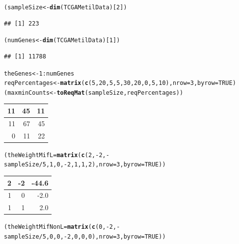 \documentclass[a4paper,10pt]{article}\usepackage[]{graphicx}\usepackage[]{xcolor}
\makeatletter
\newcommand{\hlnum}[1]{\textcolor[rgb]{0.686,0.059,0.569}{#1}}%
\newcommand{\hlopt}[1]{\textcolor[rgb]{0,0,0}{#1}}%
\newcommand{\hlstd}[1]{\textcolor[rgb]{0.345,0.345,0.345}{#1}}%
\newcommand{\hlkwb}[1]{\textcolor[rgb]{0.69,0.353,0.396}{#1}}%
\newcommand{\hlkwc}[1]{\textcolor[rgb]{0.333,0.667,0.333}{#1}}%
\newcommand{\hlkwd}[1]{\textcolor[rgb]{0.737,0.353,0.396}{\textbf{#1}}}%
\newenvironment{kframe}{%
 \def\at@end@of@kframe{}%
 \ifinner\ifhmode%
  \def\at@end@of@kframe{\end{minipage}}%
  \begin{minipage}{\columnwidth}%
 \fi\fi%
 \def\FrameCommand##1{\hskip\@totalleftmargin \hskip-\fboxsep
 \colorbox{shadecolor}{##1}\hskip-\fboxsep
     \hskip-\linewidth \hskip-\@totalleftmargin \hskip\columnwidth}%
 \MakeFramed {\advance\hsize-\width
   \@totalleftmargin\z@ \linewidth\hsize
   \@setminipage}}%
 {\par\unskip\endMakeFramed%
 \at@end@of@kframe}
\newenvironment{knitrout}{}{} %
\makeatother
\begin{document}
\begin{knitrout}
\color{fgcolor}\begin{kframe}
\begin{alltt}
\hlstd{(sampleSize} \hlkwb{<-} \hlkwd{dim}\hlstd{(TCGAMetilData)[}\hlnum{2}\hlstd{])}
\end{alltt}
\begin{verbatim}
## [1] 223
\end{verbatim}
\begin{alltt}
\hlstd{(numGenes} \hlkwb{<-}   \hlkwd{dim}\hlstd{(TCGAMetilData)[}\hlnum{1}\hlstd{])}
\end{alltt}
\begin{verbatim}
## [1] 11788
\end{verbatim}
\begin{alltt}
\hlstd{theGenes} \hlkwb{<-} \hlnum{1}\hlopt{:}\hlstd{numGenes}
\hlstd{reqPercentages} \hlkwb{<-} \hlkwd{matrix} \hlstd{(}\hlkwd{c}\hlstd{(}\hlnum{5}\hlstd{,} \hlnum{20}\hlstd{,} \hlnum{5}\hlstd{,} \hlnum{5}\hlstd{,} \hlnum{30}\hlstd{,} \hlnum{20}\hlstd{,} \hlnum{0}\hlstd{,} \hlnum{5}\hlstd{,} \hlnum{10}\hlstd{),} \hlkwc{nrow}\hlstd{=}\hlnum{3}\hlstd{,} \hlkwc{byrow}\hlstd{=}\hlnum{TRUE}\hlstd{)}
\hlstd{(maxminCounts} \hlkwb{<-} \hlkwd{toReqMat}\hlstd{(sampleSize, reqPercentages))}
\end{alltt}
\end{kframe}


\begin{tabular}{r|r|r}
\hline
11 & 45 & 11\\
\hline
11 & 67 & 45\\
\hline
0 & 11 & 22\\
\hline
\end{tabular}\begin{kframe}\begin{alltt}
\hlstd{(theWeightMifL}\hlkwb{=}\hlkwd{matrix} \hlstd{(}\hlkwd{c}\hlstd{(}\hlnum{2}\hlstd{,}\hlopt{-}\hlnum{2}\hlstd{,}\hlopt{-}\hlstd{sampleSize}\hlopt{/}\hlnum{5}\hlstd{,}\hlnum{1}\hlstd{,}\hlnum{0}\hlstd{,}\hlopt{-}\hlnum{2}\hlstd{,}\hlnum{1}\hlstd{,}\hlnum{1}\hlstd{,}\hlnum{2}\hlstd{),} \hlkwc{nrow}\hlstd{=}\hlnum{3}\hlstd{,} \hlkwc{byrow}\hlstd{=}\hlnum{TRUE}\hlstd{))}
\end{alltt}
\end{kframe}


\begin{tabular}{r|r|r}
\hline
2 & -2 & -44.6\\
\hline
1 & 0 & -2.0\\
\hline
1 & 1 & 2.0\\
\hline
\end{tabular}\begin{kframe}\begin{alltt}
\hlstd{(theWeightMifNonL}\hlkwb{=}\hlkwd{matrix} \hlstd{(}\hlkwd{c}\hlstd{(}\hlnum{0}\hlstd{,}\hlopt{-}\hlnum{2}\hlstd{,}\hlopt{-}\hlstd{sampleSize}\hlopt{/}\hlnum{5}\hlstd{,}\hlnum{0}\hlstd{,}\hlnum{0}\hlstd{,}\hlopt{-}\hlnum{2}\hlstd{,}\hlnum{0}\hlstd{,}\hlnum{0}\hlstd{,}\hlnum{0}\hlstd{),} \hlkwc{nrow}\hlstd{=}\hlnum{3}\hlstd{,} \hlkwc{byrow}\hlstd{=}\hlnum{TRUE}\hlstd{))}
\end{alltt}
\end{kframe}



\end{knitrout}
\end{document}
